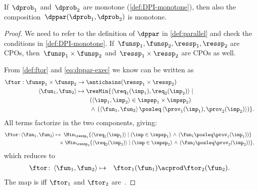 \begin{proposition}
    \label{pro:dppar-monotone}If~$\dprob_{1}$ and~$\dprob_{2}$ are
    monotone (\cref{def:DPI-monotone}), then also the composition~$\dppar(\dprob_{1},\dprob_{2})$
    is monotone.
\end{proposition}
\begin{proof}
    We need to refer to the definition of $\dppar$ in \cref{def:parallel}
    and check the conditions in \cref{def:DPI-monotone}. If~$\funsp_{1},\funsp_{2},\ressp_{1},\ressp_{2}$
    are CPOs, then~$\funsp_{1}\times\funsp_{2}$ and~$\ressp_{1}\times\ressp_{2}$
    are CPOs as well.

    From \cref{def:ftor} and \cref{eq:dppar-exec} we know \ftor can
    be written as
    \begin{align*}
        \ftor:\funsp_{1}\times\funsp_{2} & \rightarrow\antichains(\ressp_{1}\times\ressp_{2})\\
        \left\langle \fun_{1},\fun_{2}\right\rangle  & \mapsto\resMin\{\left\langle \req_{1}(\imp_{1}),\req_{2}(\imp_{2})\right\rangle \mid\\
        & \qquad\left(\left\langle \imp_{1},\imp_{2}\right\rangle \in\impsp_{1}\times\impsp_{2}\right)\\
        & \qquad\,\wedge\,\left(\left\langle \fun_{1},\fun_{2}\right\rangle \posleq\left\langle \prov_{1}(\imp_{1}),\prov_{2}(\imp_{2})\right\rangle \right)\}.
    \end{align*}
    All terms factorize in the two components, giving:{\small{}
        \begin{align*}
            \ftor\!:\!\left\langle \fun_{1},\fun_{2}\right\rangle \mapsto & \!\!\!\quad\Min_{\ressp_{1}}\{\left\langle \req_{1}(\imp_{1})\right\rangle \mid\left(\imp\in\impsp_{1}\right)\,\wedge\,\left(\fun_{1}\posleq\prov_{1}(\imp_{1})\right)\}\\
            & \!\!\!\times\Min_{\ressp_{2}}\{\left\langle \req_{2}(\imp_{2})\right\rangle \mid\left(\imp\in\impsp_{2}\right)\,\wedge\,\left(\fun_{2}\posleq\prov_{2}(\imp_{2})\right)\},
        \end{align*}
    }which reduces to
    \begin{eqnarray}
        \ftor\colon\left\langle \fun_{1},\fun_{2}\right\rangle  & \mapsto & \ftor_{1}(\fun_{1})\acprod\ftor_{2}(\fun_{2}).\label{eq:isproduct}
    \end{eqnarray}
    The map \ftor is \scottcontinuous iff $\ftor_{1}$ and $\ftor_{2}$
    are~\cite[Lemma II.2.8]{gierz03continuous}.
\end{proof}

